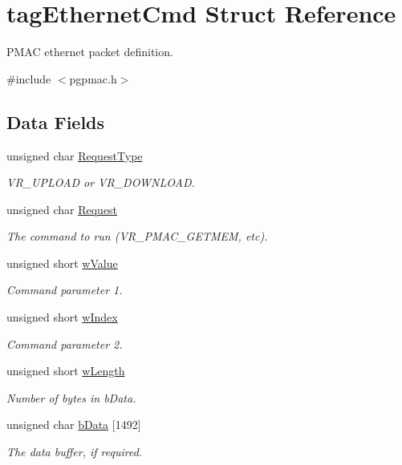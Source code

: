 \hypertarget{structtagEthernetCmd}{
\section{tagEthernetCmd Struct Reference}
\label{structtagEthernetCmd}
}


PMAC ethernet packet definition.  


{\ttfamily \#include $<$pgpmac.h$>$}\subsection*{Data Fields}
\begin{DoxyCompactItemize}
\item 
unsigned char \hyperlink{structtagEthernetCmd_a6a155eb3ae546dd29369c4a33ddb3310}{RequestType}
\begin{DoxyCompactList}\small\item\em VR\_\-UPLOAD or VR\_\-DOWNLOAD. \item\end{DoxyCompactList}\item 
unsigned char \hyperlink{structtagEthernetCmd_a0dc566e7edbb226f1a4ea443d93d56e2}{Request}
\begin{DoxyCompactList}\small\item\em The command to run (VR\_\-PMAC\_\-GETMEM, etc). \item\end{DoxyCompactList}\item 
unsigned short \hyperlink{structtagEthernetCmd_aec0ee9a5f6c7e3bc6e4bd98f1bd52783}{wValue}
\begin{DoxyCompactList}\small\item\em Command parameter 1. \item\end{DoxyCompactList}\item 
unsigned short \hyperlink{structtagEthernetCmd_a92f5a374e87d4f496b64b4888850d6e6}{wIndex}
\begin{DoxyCompactList}\small\item\em Command parameter 2. \item\end{DoxyCompactList}\item 
unsigned short \hyperlink{structtagEthernetCmd_af5df25ff13ca30fa33719d0df1ab7e97}{wLength}
\begin{DoxyCompactList}\small\item\em Number of bytes in bData. \item\end{DoxyCompactList}\item 
unsigned char \hyperlink{structtagEthernetCmd_a872dab798127d6f589974a79c5d0aef1}{bData} \mbox{[}1492\mbox{]}
\begin{DoxyCompactList}\small\item\em The data buffer, if required. \item\end{DoxyCompactList}\end{DoxyCompactItemize}


